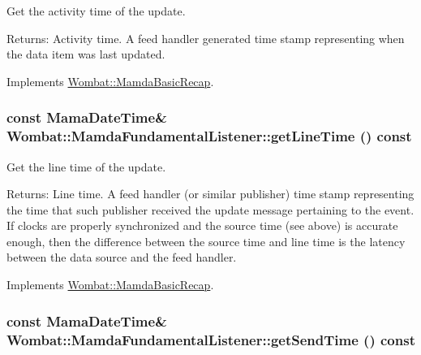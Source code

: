 Get the activity time of the update. 

\begin{Desc}
\item[Returns:]Activity time. A feed handler generated time stamp representing when the data item was last updated. \end{Desc}


Implements \hyperlink{classWombat_1_1MamdaBasicRecap_9444ec99a8cfd96a08a7c34a489bd0df}{Wombat::Mamda\-Basic\-Recap}.\hypertarget{classWombat_1_1MamdaFundamentalListener_d3e5f97ea0ada9b6db4a8b59e3711da8}{
\subsubsection[getLineTime]{\setlength{\rightskip}{0pt plus 5cm}const Mama\-Date\-Time\& Wombat::Mamda\-Fundamental\-Listener::get\-Line\-Time () const}}
\label{classWombat_1_1MamdaFundamentalListener_d3e5f97ea0ada9b6db4a8b59e3711da8}


Get the line time of the update. 

\begin{Desc}
\item[Returns:]Line time. A feed handler (or similar publisher) time stamp representing the time that such publisher received the update message pertaining to the event. If clocks are properly synchronized and the source time (see above) is accurate enough, then the difference between the source time and line time is the latency between the data source and the feed handler. \end{Desc}


Implements \hyperlink{classWombat_1_1MamdaBasicRecap_acebac8f3a0d9a82eef145aca53a6d77}{Wombat::Mamda\-Basic\-Recap}.\hypertarget{classWombat_1_1MamdaFundamentalListener_336c86d3f8e9c79c8641e74b146497b3}{
\subsubsection[getSendTime]{\setlength{\rightskip}{0pt plus 5cm}const Mama\-Date\-Time\& Wombat::Mamda\-Fundamental\-Listener::get\-Send\-Time () const}}
\label{classWombat_1_1MamdaFundamentalListener_336c86d3f8e9c79c8641e74b146497b3}


